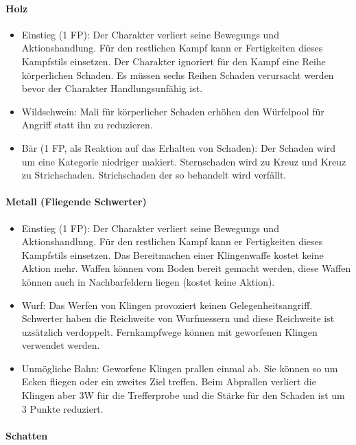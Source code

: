 \documentclass{article}
\begin{document}
\paragraph{Holz}

\begin{itemize}
\item Einstieg (1 FP): Der Charakter verliert seine Bewegungs und Aktionshandlung. Für den restlichen Kampf kann er Fertigkeiten dieses Kampfstils einsetzen. Der Charakter ignoriert für den Kampf eine Reihe körperlichen Schaden. Es müssen sechs Reihen Schaden verursacht werden bevor der Charakter Handlungsunfähig ist.
\item Wildschwein: Mali für körperlicher Schaden erhöhen den Würfelpool für Angriff statt ihn zu reduzieren.
\item Bär (1 FP, als Reaktion auf das Erhalten von Schaden): Der Schaden wird um eine Kategorie niedriger makiert. Sternschaden wird zu Kreuz und Kreuz zu Strichschaden. Strichschaden der so behandelt wird verfällt.
\end{itemize}

\paragraph{Metall (Fliegende Schwerter)}

\begin{itemize}
\item Einstieg (1 FP): Der Charakter verliert seine Bewegungs und Aktionshandlung. Für den restlichen Kampf kann er Fertigkeiten dieses Kampfstils einsetzen. Das Bereitmachen einer Klingenwaffe kostet keine Aktion mehr. Waffen können vom Boden bereit gemacht werden, diese Waffen können auch in Nachbarfeldern liegen (kostet keine Aktion).
\item Wurf: Das Werfen von Klingen provoziert keinen Gelegenheitsangriff. Schwerter haben die Reichweite von Wurfmessern und diese Reichweite ist uzsätzlich verdoppelt. Fernkampfwege können mit geworfenen Klingen verwendet werden.
\item Unmögliche Bahn: Geworfene Klingen prallen einmal ab. Sie können so um Ecken fliegen oder ein zweites Ziel treffen. Beim Abprallen verliert die Klingen aber 3W für die Trefferprobe und die Stärke für den Schaden ist um 3 Punkte reduziert.
\end{itemize}

\paragraph{Schatten}
\end{document}
